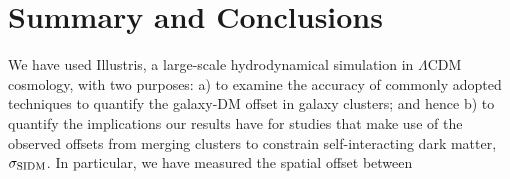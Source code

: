 \documentclass[usenatbib]{mn2e}
\newcommand{\offset}{\Delta {\bf s}}
\newcommand{\SIDM}{{\rm SIDM}}
\begin{document}
{%


 



\section{Summary and Conclusions}
\label{sec:conclusions}

We have used Illustris, a large-scale hydrodynamical simulation in $\Lambda$CDM cosmology, with two purposes:
a) to examine the accuracy of commonly adopted techniques to quantify the galaxy-DM offset in galaxy clusters; and hence b) to quantify the implications our results have for studies that make use of the observed offsets from merging clusters to constrain self-interacting dark matter, $\sigma_\SIDM$.
%
In particular, we have measured the spatial offset between \\

}
\end{document}
